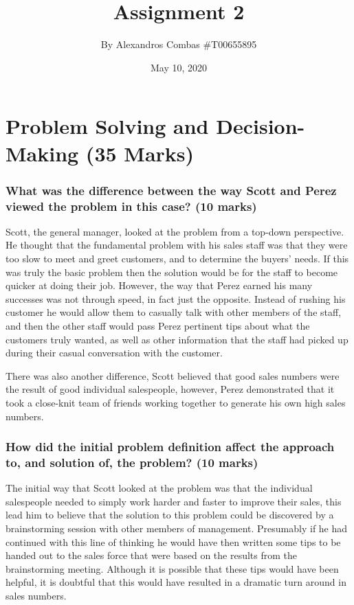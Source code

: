 \documentclass[12pt,titlepage]{article}
\begin{document}
\title{\Huge{\textbf{Assignment 2}}}
\author{By Alexandros Combas \#T00655895}
\date{May 10, 2020}
\maketitle

\renewcommand\thepart{\Alph{part}}
\part{Problem Solving and Decision-Making (35 Marks)}

\section{What was the difference between the way Scott and Perez viewed the problem in this case? (10 marks)}
	
Scott, the general manager, looked at the problem from a top-down perspective. He thought that the fundamental problem with his sales staff was that they were too slow to meet and greet customers, and to determine the buyers' needs. If this was truly the basic problem then the solution would be for the staff to become quicker at doing their job. However, the way that Perez earned his many successes was not through speed, in fact just the opposite. Instead of rushing his customer he would allow them to casually talk with other members of the staff, and then the other staff would pass Perez pertinent tips about what the customers truly wanted, as well as other information that the staff had picked up during their casual conversation with the customer.

There was also another difference, Scott believed that good sales
numbers were the result of good individual salespeople, however, Perez demonstrated that it took a close-knit team of friends working together to generate his own high sales numbers.

\section{How did the initial problem definition affect the approach to, and solution of, the problem? (10 marks)}

The initial way that Scott looked at the problem was that the individual salespeople needed to simply work harder and faster to improve their sales, this lead him to believe that the solution to this problem could be discovered by a brainstorming session with other members of management. Presumably if he had continued with this line of thinking he would have then written some tips to be handed out to the sales force that were based on the results from the brainstorming meeting. Although it is possible that these tips would have been helpful, it is doubtful that this would have resulted in a dramatic turn around in sales numbers.
\end{document}
